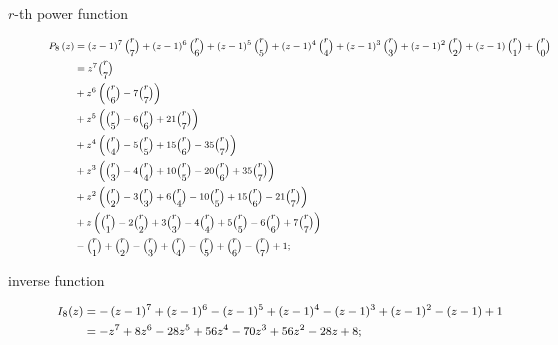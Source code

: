 \begin{description}
\item[$r$-th power function]
\begin{displaymath}
\footnotesize
    \begin{split}
        P_{8}\left (z \right )  &= \left(z - 1\right)^{7} {\binom{r}{7}} + \left(z - 1\right)^{6} {\binom{r}{6}} + \left(z - 1\right)^{5} {\binom{r}{5}} + \left(z - 1\right)^{4} {\binom{r}{4}}
                            + \left(z - 1\right)^{3} {\binom{r}{3}} + \left(z - 1\right)^{2} {\binom{r}{2}} + \left(z - 1\right) {\binom{r}{1}} + {\binom{r}{0}} \\
                            &= z^{7} {\binom{r}{7}} \\
                            &+ z^{6} \left({\binom{r}{6}} - 7 {\binom{r}{7}}\right) \\
                            &+ z^{5} \left({\binom{r}{5}} - 6 {\binom{r}{6}} + 21 {\binom{r}{7}}\right) \\
                            &+ z^{4} \left({\binom{r}{4}} - 5 {\binom{r}{5}} + 15 {\binom{r}{6}} - 35 {\binom{r}{7}}\right) \\
                            &+ z^{3} \left({\binom{r}{3}} - 4 {\binom{r}{4}} + 10 {\binom{r}{5}} - 20 {\binom{r}{6}} + 35 {\binom{r}{7}}\right) \\
                            &+ z^{2} \left({\binom{r}{2}} - 3 {\binom{r}{3}} + 6 {\binom{r}{4}} - 10 {\binom{r}{5}} + 15 {\binom{r}{6}} - 21 {\binom{r}{7}}\right) \\
                            &+ z \left({\binom{r}{1}} - 2 {\binom{r}{2}} + 3 {\binom{r}{3}} - 4 {\binom{r}{4}} + 5 {\binom{r}{5}} - 6 {\binom{r}{6}} + 7 {\binom{r}{7}}\right) \\
                            &- {\binom{r}{1}} + {\binom{r}{2}} - {\binom{r}{3}} + {\binom{r}{4}} - {\binom{r}{5}} + {\binom{r}{6}} - {\binom{r}{7}} + 1;
    \end{split}
\end{displaymath}
\item[inverse function]
\begin{displaymath}
\footnotesize
    \begin{split} 
        I_{8}{\left (z \right )} &= - \left(z - 1\right)^{7} + \left(z - 1\right)^{6} - \left(z - 1\right)^{5} + \left(z - 1\right)^{4} - \left(z - 1\right)^{3} + \left(z - 1\right)^{2} - (z-1) + 1\\
                             &= - z^{7} + 8 z^{6} - 28 z^{5} + 56 z^{4} - 70 z^{3} + 56 z^{2} - 28 z + 8;

\end{split}
\end{displaymath}
\end{description}
